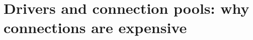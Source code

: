 \chapter{Drivers and connection pools: why connections are expensive}
\label{ch:drivers-and-connection-pools-why}

